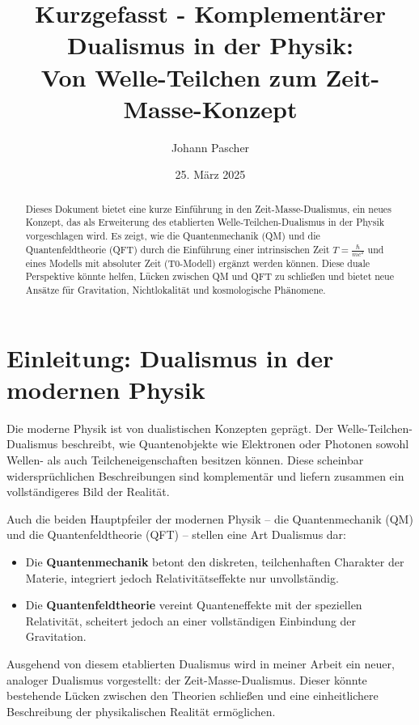 \documentclass[a4paper,12pt]{article}
\begin{document}
	
	\title{Kurzgefasst - Komplementärer Dualismus in der Physik: \\ Von Welle-Teilchen zum Zeit-Masse-Konzept}
	\author{Johann Pascher}
	\date{25. März 2025}
	\maketitle
	
	\begin{abstract}
		Dieses Dokument bietet eine kurze Einführung in den Zeit-Masse-Dualismus, ein neues Konzept, das als Erweiterung des etablierten Welle-Teilchen-Dualismus in der Physik vorgeschlagen wird. Es zeigt, wie die Quantenmechanik (QM) und die Quantenfeldtheorie (QFT) durch die Einführung einer intrinsischen Zeit \( T = \frac{\hbar}{mc^2} \) und eines Modells mit absoluter Zeit (T0-Modell) ergänzt werden können. Diese duale Perspektive könnte helfen, Lücken zwischen QM und QFT zu schließen und bietet neue Ansätze für Gravitation, Nichtlokalität und kosmologische Phänomene.
	\end{abstract}
	
	\tableofcontents
	\newpage
	
	\section{Einleitung: Dualismus in der modernen Physik}
	
	Die moderne Physik ist von dualistischen Konzepten geprägt. Der Welle-Teilchen-Dualismus beschreibt, wie Quantenobjekte wie Elektronen oder Photonen sowohl Wellen- als auch Teilcheneigenschaften besitzen können. Diese scheinbar widersprüchlichen Beschreibungen sind komplementär und liefern zusammen ein vollständigeres Bild der Realität.
	
	Auch die beiden Hauptpfeiler der modernen Physik – die Quantenmechanik (QM) und die Quantenfeldtheorie (QFT) – stellen eine Art Dualismus dar:
	\begin{itemize}
		\item Die \textbf{Quantenmechanik} betont den diskreten, teilchenhaften Charakter der Materie, integriert jedoch Relativitätseffekte nur unvollständig.
		\item Die \textbf{Quantenfeldtheorie} vereint Quanteneffekte mit der speziellen Relativität, scheitert jedoch an einer vollständigen Einbindung der Gravitation.
	\end{itemize}
	
	Ausgehend von diesem etablierten Dualismus wird in meiner Arbeit \cite{pascher_planck_2025} ein neuer, analoger Dualismus vorgestellt: der Zeit-Masse-Dualismus. Dieser könnte bestehende Lücken zwischen den Theorien schließen und eine einheitlichere Beschreibung der physikalischen Realität ermöglichen.
	
\end{document}

